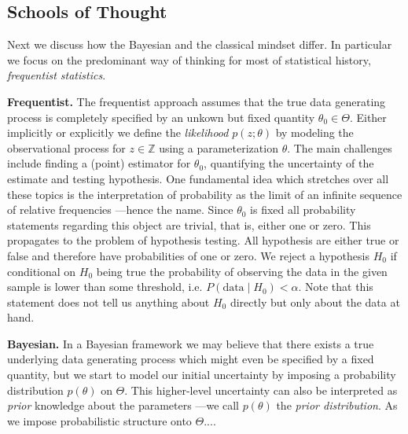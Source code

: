 \subsection{Schools of Thought}
Next we discuss how the Bayesian and the classical mindset differ. In particular we focus on the predominant way of thinking for most of statistical history, \textit{frequentist statistics}.

\textbf{Frequentist.} The frequentist approach assumes that the true data generating process is completely specified by an unkown but fixed quantity $\theta_0 \in \Theta$.
Either implicitly or explicitly we define the \textit{likelihood} $p(z; \theta)$ by modeling the observational process for $z \in \mathbb{Z}$ using a parameterization $\theta$.
The main challenges include finding a (point) estimator for $\theta_0$, quantifying the uncertainty of the estimate and testing hypothesis.
One fundamental idea which stretches over all these topics is the interpretation of probability as the limit of an infinite sequence of relative frequencies ---hence the name.
Since $\theta_0$ is fixed all probability statements regarding this object are trivial, that is, either one or zero. This propagates to the problem of hypothesis testing.
All hypothesis are either true or false and therefore have probabilities of one or zero.
We reject a hypothesis $H_0$ if conditional on $H_0$ being true the probability of observing the data in the given sample is lower than some threshold, i.e. $P(\text{data} \mid H_0) < \alpha$.
Note that this statement does not tell us anything about $H_0$ directly but only about the data at hand.

\textbf{Bayesian.} In a Bayesian framework we may believe that there exists a true underlying data generating process which might even be specified by a fixed quantity, but we start to model our initial uncertainty by imposing a probability distribution $p(\theta)$ on $\Theta$.
This higher-level uncertainty can also be interpreted as \textit{prior} knowledge about the parameters ---we call $p(\theta)$ the \textit{prior distribution}.
As we impose probabilistic structure onto $\Theta$....


